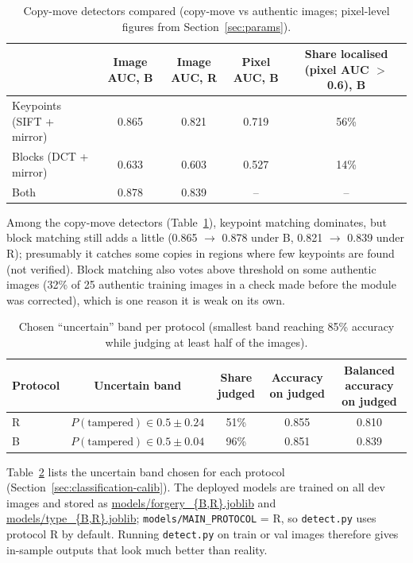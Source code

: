 \begin{table}[!ht]
\centering
\caption{Copy-move detectors compared (copy-move vs authentic images; pixel-level figures from Section~\ref{sec:params}).}
\label{tab:app-copymove}
\footnotesize
\begin{tabular}{lcccc}
\toprule
 & Image AUC, B & Image AUC, R & Pixel AUC, B & Share localised (pixel AUC $>$ 0.6), B \\
\midrule
Keypoints (SIFT + mirror) & 0.865 & 0.821 & 0.719 & 56\% \\
Blocks (DCT + mirror) & 0.633 & 0.603 & 0.527 & 14\% \\
Both & 0.878 & 0.839 & -- & -- \\
\bottomrule
\end{tabular}
\end{table}

Among the copy-move detectors (Table~\ref{tab:app-copymove}), keypoint matching dominates, but block matching still adds a little (0.865 $\to$ 0.878 under B, 0.821 $\to$ 0.839 under R); presumably it catches some copies in regions where few keypoints are found (not verified). Block matching also votes above threshold on some authentic images (32\% of 25 authentic training images in a check made before the module was corrected), which is one reason it is weak on its own.

\begin{table}[!ht]
\centering
\caption{Chosen ``uncertain'' band per protocol (smallest band reaching 85\% accuracy while judging at least half of the images).}
\label{tab:app-band}
\footnotesize
\begin{tabular}{lcccc}
\toprule
Protocol & Uncertain band & Share judged & Accuracy on judged & Balanced accuracy on judged \\
\midrule
R & $P(\text{tampered}) \in 0.5 \pm 0.24$ & 51\% & 0.855 & 0.810 \\
B & $P(\text{tampered}) \in 0.5 \pm 0.04$ & 96\% & 0.851 & 0.839 \\
\bottomrule
\end{tabular}
\end{table}

Table~\ref{tab:app-band} lists the uncertain band chosen for each protocol (Section~\ref{sec:classification-calib}). The deployed models are trained on all dev images and stored as \url{models/forgery_{B,R}.joblib} and \url{models/type_{B,R}.joblib}; \texttt{models/MAIN\_PROTOCOL} = R, so \texttt{detect.py} uses protocol R by default. Running \texttt{detect.py} on train or val images therefore gives in-sample outputs that look much better than reality.


